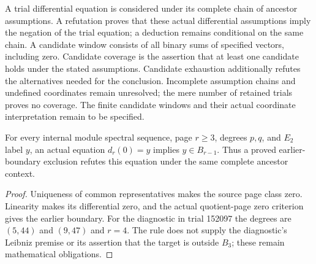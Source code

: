 \begin{definition}
  \label{def:lin-conditional-branches}
  A trial differential equation is considered under its complete chain
  of ancestor assumptions. A refutation proves that these actual
  differential assumptions imply the negation of the trial equation;
  a deduction remains conditional on the same chain.
  A candidate window consists of all binary sums of specified vectors,
  including zero. Candidate coverage is the assertion that at least
  one candidate holds under the stated assumptions. Candidate exhaustion
  additionally refutes the alternatives needed for the conclusion.
  Incomplete assumption chains and undefined coordinates remain
  unresolved; the mere number of retained trials proves no coverage.
  The finite candidate windows and their actual coordinate interpretation
  remain to be specified.
\end{definition}

\begin{lemma}
  \label{lem:lin-zero-source-refutation}
  \leanok
  For every internal module spectral sequence, page $r\ge3$, degrees
  $p,q$, and $E_2$ label $y$, an actual equation $d_r(0)=y$ implies
  $y\in B_{r-1}$. Thus a proved earlier-boundary exclusion refutes this
  equation under the same complete ancestor context.
\end{lemma}
\begin{proof}
  \leanok
  Uniqueness of common representatives makes the source page class zero.
  Linearity makes its differential zero, and the actual quotient-page
  zero criterion gives the earlier boundary. For the diagnostic in trial
  152097 the degrees are $(5,44)$ and $(9,47)$ and $r=4$. The rule does not
  supply the diagnostic's Leibniz premise or its assertion that the target
  is outside $B_3$; these remain mathematical obligations.
\end{proof}

